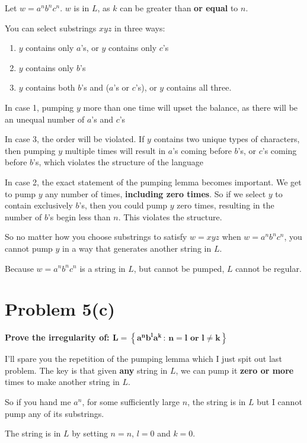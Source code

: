 \documentclass{report}
\begin{document}
Let $w = a^n b^n c^n$. $w$ is in $L$, as $k$ can be greater than \textbf{or equal} to $n$.

You can select substrings $xyz$ in three ways:
\begin{enumerate}
\item $y$ contains only $a$'s, or $y$ contains only $c$'s
\item $y$ contains only $b$'s
\item $y$ contains both $b$'s and ($a$'s or $c$'s), or $y$ contains all three.
\end{enumerate}

In case 1, pumping $y$ more than one time will upset the balance, as there will be an unequal number of $a$'s and $c$'s

In case 3, the order will be violated. If $y$ contains two unique types of characters, then pumping $y$ multiple times will result in $a$'s coming before $b$'s, or $c$'s coming before $b$'s, which violates the structure of the language

In case 2, the exact statement of the pumping lemma becomes important. We get to pump $y$ any number of times, \textbf{including zero times}.
So if we select $y$ to contain exclusively $b$'s, then you could pump $y$ zero times, resulting in the number of $b$'s begin less than $n$.
This violates the structure.

So no matter how you choose substrings to satisfy $w = xyz$ when $w = a^n b^n c^n$, you cannot pump $y$ in a way that generates another string in $L$.

Because $w = a^n b^n c^n$ is a string in $L$, but cannot be pumped, $L$ cannot be regular.


\section*{Problem 5(c)}

\textbf{Prove the irregularity of: $\mathbf{L = \left\{a^n b^l a^k \, : \,  n = l \text{ or } l \neq k \right\}}$}

I'll spare you the repetition of the pumping lemma which I just spit out last problem.
The key is that given \textbf{any} string in $L$, we can pump it \textbf{zero or more} times to make another string in $L$.

So if you hand me $a^{n}$, for some sufficiently large $n$, the string is in $L$ but I cannot pump any of its substrings.

The string is in $L$ by setting $n=n$, $l=0$ and $k = 0$.
\end{document}
